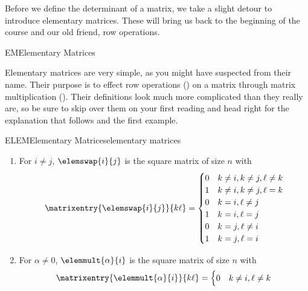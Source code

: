 %
\begin{introduction}
\begin{para}Before we define the determinant of a matrix, we take a slight detour to introduce elementary matrices.  These will bring us back to the beginning of the course and our old friend, row operations.\end{para}
\end{introduction}
%
\begin{subsect}{EM}{Elementary Matrices}
%
\begin{para}Elementary matrices are very simple, as you might have suspected from their name.  Their purpose is to effect row operations () on a matrix through matrix multiplication ().  Their definitions look much more complicated than they really are, so be sure to skip over them on your first reading and head right for the explanation that follows and the first example.\end{para}
%
\begin{definition}{ELEM}{Elementary Matrices}{elementary matrices}
\begin{para}
\begin{enumerate}
\item For $i\neq j$, $\elemswap{i}{j}$ is the square matrix of size $n$ with
%
\begin{equation*}
\matrixentry{\elemswap{i}{j}}{k\ell}=
\begin{cases}
0 & k\neq i, k\neq j, \ell\neq k\\
1 & k\neq i, k\neq j, \ell=k\\
0 & k=i, \ell\neq j\\
1 & k=i, \ell=j\\
0 & k=j, \ell\neq i\\
1 & k=j, \ell=i
\end{cases}
\end{equation*}
%
\item For $\alpha\neq 0$, $\elemmult{\alpha}{i}$ is the square matrix of size $n$ with
%
\begin{equation*}
\matrixentry{\elemmult{\alpha}{i}}{k\ell}=
\begin{cases}
0        & k\neq i, \ell\neq k\\

\end{cases}
\end{equation*}
\end{enumerate}
\end{para}
\end{definition}
\end{subsect}
